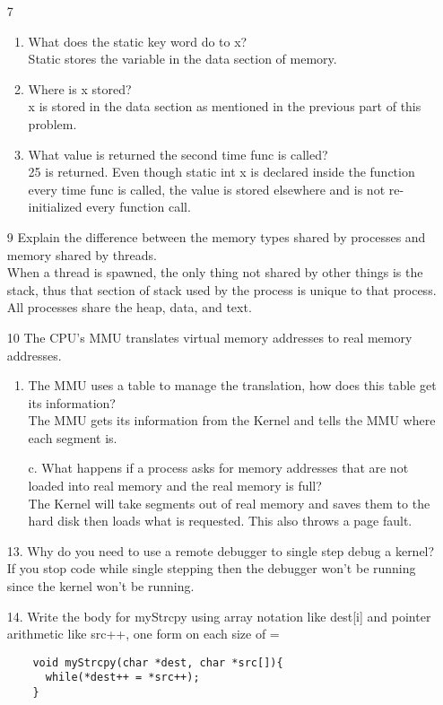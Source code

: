 \documentclass{report}
\begin{document}
\begin{enumerate}
\item[7]
	\begin{enumerate}
	\item What does the static key word do to x?\\
		Static stores the variable in the data section of memory.
	\item Where is x stored?\\
		x is stored in the data section as mentioned in the previous part of this problem.
	\item What value is returned the second time func is called?\\
		25 is returned. Even though static int x is declared inside the function every time func is called, the value is stored elsewhere and is not re-initialized every function call.
	\end{enumerate}

\item[9]Explain the difference between the memory types shared by processes and memory shared by threads.\\
	When a thread is spawned, the only thing not shared by other things is the stack, thus that section of stack used by the process is unique to that process. All processes share the heap, data, and text.
	
\item[10]The CPU's MMU translates virtual memory addresses to real memory addresses.
	\begin{enumerate}
	\item The MMU uses a table to manage the translation, how does this table get its information?\\
		The MMU gets its information from the Kernel and tells the MMU where each segment is.
	\item[c.] What happens if a process asks for memory addresses that are not loaded into real memory and the real memory is full?\\
		The Kernel will take segments out of real memory and saves them to the hard disk then loads what is requested. This also throws a page fault.
	\end{enumerate}

\item[13.]Why do you need to use a remote debugger to single step debug a kernel?\\
If you stop code while single stepping then the debugger won't be running since the kernel won't be running.

\item[14.]Write the body for myStrcpy using array notation like dest[i] and pointer arithmetic like src++, one form on each size of =\\
	\begin{verbatim}
	void myStrcpy(char *dest, char *src[]){
	  while(*dest++ = *src++);
	}
	\end{verbatim}


\end{enumerate}
\end{document}
